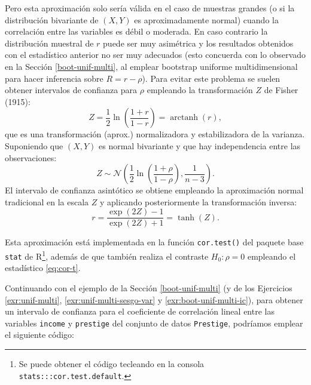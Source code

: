 \documentclass[
  10pt,
]{book}
\newenvironment{Shaded}{\begin{snugshade}}{\end{snugshade}}
\newcommand{\AttributeTok}[1]{\textcolor[rgb]{0.77,0.63,0.00}{#1}}
\newcommand{\CommentTok}[1]{\textcolor[rgb]{0.56,0.35,0.01}{\textit{#1}}}
\newcommand{\FunctionTok}[1]{\textcolor[rgb]{0.00,0.00,0.00}{#1}}
\newcommand{\NormalTok}[1]{#1}
\newcommand{\SpecialCharTok}[1]{\textcolor[rgb]{0.00,0.00,0.00}{#1}}
\newcommand{\StringTok}[1]{\textcolor[rgb]{0.31,0.60,0.02}{#1}}
\theoremstyle{break}
\theoremstyle{nonumberplain}
\renewcommand{\CommentTok}[1]{\textcolor[rgb]{0.41,0.41,0.41}{\texttt{#1}}}
\let\oldfootnote\footnote
\renewcommand\footnote[1]{\oldfootnote{\hspace{2mm}#1}}
\begin{document}
Pero esta aproximación solo sería válida en el caso de muestras grandes (o si la distribución bivariante de \((X, Y)\) es aproximadamente normal) cuando la correlación entre las variables es débil o moderada.
En caso contrario la distribución muestral de \(r\) puede ser muy asimétrica y los resultados obtenidos con el estadístico anterior no ser muy adecuados (esto concuerda con lo observado en la Sección \ref{boot-unif-multi}, al emplear bootstrap uniforme multidimensional para hacer inferencia sobre \(R = r -\rho\)).
Para evitar este problema se suelen obtener intervalos de confianza para \(\rho\) empleando la transformación \(Z\) de Fisher (1915):
\[Z = \frac{1}{2}\ln \left( \frac{1+r}{1-r} \right) = \operatorname{arctanh}(r),\]
que es una transformación (aprox.) normalizadora y estabilizadora de la varianza.
Suponiendo que \((X, Y)\) es normal bivariante y que hay independencia entre las observaciones:
\[Z \sim \mathcal{N}\left( \frac{1}{2}\ln \left( \frac{1+\rho}{1-\rho} \right), \frac{1}{n-3} \right).\]
El intervalo de confianza asintótico se obtiene empleando la aproximación normal tradicional en la escala \(Z\) y aplicando posteriormente la transformación inversa:
\[r = \frac{\exp(2Z)-1}{\exp(2Z)+1} = \operatorname{tanh}(Z).\]

Esta aproximación está implementada en la función \texttt{cor.test()} del paquete base \texttt{stat} de R\footnote{Se puede obtener el código tecleando en la consola \texttt{stats:::cor.test.default}.}, además de que también realiza el contraste \(H_0: \rho = 0\) empleando el estadístico \eqref{eq:cor-t}.

Continuando con el ejemplo de la Sección \ref{boot-unif-multi} (y de los Ejercicios \ref{exr:unif-multi}, \ref{exr:unif-multi-sesgo-var} y \ref{exr:boot-unif-multi-ic}), para obtener un intervalo de confianza para el coeficiente de correlación lineal entre las variables \texttt{income} y \texttt{prestige} del conjunto de datos \texttt{Prestige}, podríamos emplear el siguiente código:

\begin{Shaded}
\end{Shaded}
\end{document}
